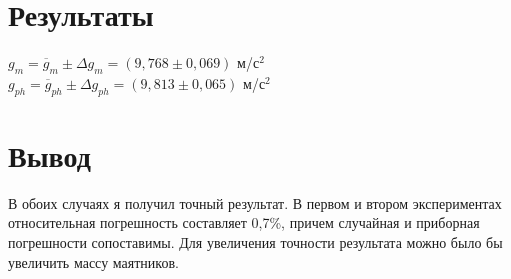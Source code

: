 \documentclass[13pt]{article}
\begin{document}
	\section{Результаты}
	$g_m=\overline{g}_m\pm\Delta g_m=(9,768\pm0,069)$ м/с$^2$\\
	$g_{ph}=\overline{g}_{ph}\pm\Delta g_{ph}=(9,813\pm0,065)$ м/с$^2$\\
	\section{Вывод}
	В обоих случаях я получил точный результат. В первом и втором экспериментах относительная погрешность составляет 0,7\%, причем случайная и приборная погрешности сопоставимы. Для увеличения точности результата можно было бы увеличить массу маятников.
\end{document}
